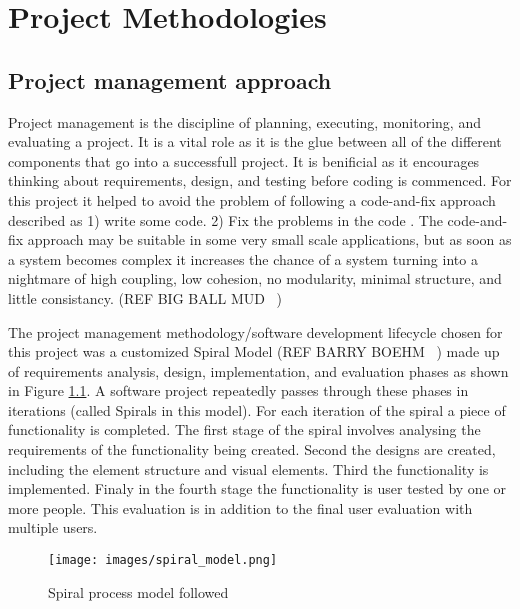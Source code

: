 
\chapter{Project Methodologies}\label{C:m}

\section{Project management approach}
Project management is the discipline of planning, executing, monitoring, and evaluating a project. It is a vital role as it is the glue between all of the different components that go into a successfull project. It is benificial as it encourages thinking about requirements, design, and testing before coding is commenced. For this project it helped to avoid the problem of following a code-and-fix approach described  as 1) write some code. 2) Fix the problems in the code \cite{boehm}. The code-and-fix approach may be suitable in some very small scale applications, but as soon as a system becomes complex it increases the chance of a system turning into a nightmare of high coupling, low cohesion, no modularity, minimal structure, and little consistancy. (REF BIG BALL MUD ~)

The project management methodology/software development lifecycle chosen for this project was a customized Spiral Model (REF BARRY BOEHM ~) made up of requirements analysis, design, implementation, and evaluation phases as shown in Figure \ref{fig:spiralModel}. 
A software project repeatedly passes through these phases in iterations (called Spirals in this model). For each iteration of the spiral a piece of functionality is completed. The first stage of the spiral involves analysing the requirements of the functionality being created. Second the designs are created, including the element structure and visual elements. Third the functionality is implemented. Finaly in the fourth stage the functionality is user tested by one or more people. This evaluation is in addition to the final user evaluation with multiple users. 

\begin{figure}[h!]
  \centering
      \texttt{[image: images/spiral\_model.png]}
  \caption{Spiral process model followed}
  \label{fig:spiralModel}
\end{figure}

